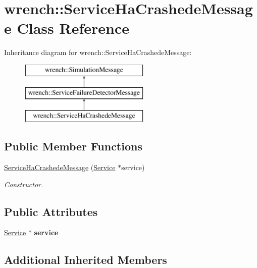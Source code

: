 \hypertarget{classwrench_1_1_service_ha_crashede_message}{}\section{wrench\+:\+:Service\+Ha\+Crashede\+Message Class Reference}
\label{classwrench_1_1_service_ha_crashede_message}
Inheritance diagram for wrench\+:\+:Service\+Ha\+Crashede\+Message\+:\begin{figure}[H]
\begin{center}
\leavevmode
\includegraphics[height=3.000000cm]{classwrench_1_1_service_ha_crashede_message}
\end{center}
\end{figure}
\subsection*{Public Member Functions}
\begin{DoxyCompactItemize}
\item 
\hyperlink{classwrench_1_1_service_ha_crashede_message_a88c03754a59f3b6df13f650e59c5d3f7}{Service\+Ha\+Crashede\+Message} (\hyperlink{classwrench_1_1_service}{Service} $\ast$service)
\begin{DoxyCompactList}\small\item\em Constructor. \end{DoxyCompactList}\end{DoxyCompactItemize}
\subsection*{Public Attributes}
\begin{DoxyCompactItemize}
\item 
\mbox{\label{classwrench_1_1_service_ha_crashede_message_a3d7f124a98511542c56fc707581265ac}} 
\hyperlink{classwrench_1_1_service}{Service} $\ast$ {\bfseries service}
\end{DoxyCompactItemize}
\subsection*{Additional Inherited Members}


